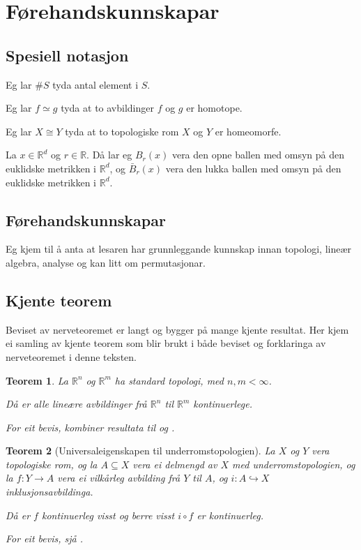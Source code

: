 \documentclass[a4paper, 12pt, norsk]{article}
\theoremstyle{plain}
\newtheorem{theorem}{Teorem}[section]
\theoremstyle{definition}
\newcommand{\Rb}{\mathbb{R}}
\begin{document}
\section{Førehandskunnskapar}

\subsection{Spesiell notasjon}
 
Eg lar \( \#S \) tyda antal element i \( S \).

Eg lar \( f \simeq  g \) tyda at to avbildinger \( f \) og \( g \) er homotope.

Eg lar \( X \cong Y \) tyda at to topologiske rom \( X \) og \( Y \) er homeomorfe.

La \( x \in \Rb^d \) og \( r \in \Rb \). Då lar eg \( B_r(x) \) vera den opne ballen med omsyn på den euklidske metrikken i \( \Rb^d \), og \( \bar{B}_r(x) \) vera den lukka ballen med omsyn på den euklidske metrikken i \( \Rb^d \).

\subsection{Førehandskunnskapar}

Eg kjem til å anta at lesaren har grunnleggande kunnskap innan topologi, lineær algebra, analyse og kan litt om permutasjonar.

\subsection{Kjente teorem} %

Beviset av nerveteoremet er langt og bygger på mange kjente resultat. Her kjem ei samling av kjente teorem som blir brukt i både beviset og forklaringa av nerveteoremet i denne teksten.

\begin{theorem} \label{thm:avgrensa-lin-op-er-kont}
	La \( \Rb^n \) og \( \Rb^m \) ha standard topologi, med \( n, m < \infty \).

	Då er alle lineære avbildinger frå \( \Rb^n \) til \( \Rb^m \) kontinuerlege.

	For eit bevis, kombiner resultata til \cite[Theroem 6.3.1]{MR3838450} og \cite[Theorem 6.4.1]{MR3838450}.
\end{theorem}

\begin{theorem}[Universaleigenskapen til underromstopologien] \label{thm:universal-eigenskap-underromstopologi}
	La \( X \) og \( Y \) vera topologiske rom, og la \( A \subseteq X \) vera ei delmengd av \( X \) med underromstopologien, og la \( f: Y \to A \) vera ei vilkårleg avbilding frå \( Y \) til \( A \), og \( i: A \hookrightarrow X \) inklusjonsavbildinga. 
	
	Då er \( f \) kontinuerleg visst og berre visst \( i \circ f \) er kontinuerleg.

	For eit bevis, sjå \cite[s. 98]{MR2548039}.
\end{theorem}
\end{document}
